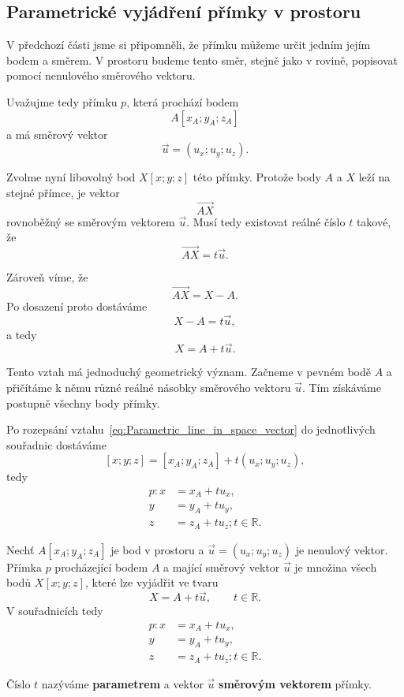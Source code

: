 \subsection{Parametrické vyjádření přímky v prostoru}
\label{subsec:Parametric_line_in_space}

V předchozí části jsme si připomněli, že přímku můžeme určit jedním jejím
bodem a směrem. V prostoru budeme tento směr, stejně jako v rovině,
popisovat pomocí nenulového směrového vektoru.

Uvažujme tedy přímku $p$, která prochází bodem
\[
    A[x_A;y_A;z_A]
\]
a má směrový vektor
\[
    \vec{u}=(u_x;u_y;u_z).
\]

Zvolme nyní libovolný bod $X[x;y;z]$ této přímky. Protože body $A$ a $X$
leží na stejné přímce, je vektor
\[
    \overrightarrow{AX}
\]
rovnoběžný se směrovým vektorem $\vec{u}$. Musí tedy existovat reálné číslo
$t$ takové, že
\[
    \overrightarrow{AX}=t\vec{u}.
\]

Zároveň víme, že
\[
    \overrightarrow{AX}=X-A.
\]
Po dosazení proto dostáváme
\[
    X-A=t\vec{u},
\]
a tedy
\begin{equation}
    X=A+t\vec{u}.
    \label{eq:Parametric_line_in_space_vector}
\end{equation}

Tento vztah má jednoduchý geometrický význam. Začneme v pevném bodě $A$
a přičítáme k němu různé reálné násobky směrového vektoru $\vec{u}$.
Tím získáváme postupně všechny body přímky.

Po rozepsání vztahu~\eqref{eq:Parametric_line_in_space_vector} do
jednotlivých souřadnic dostáváme
\[
    [x;y;z]
    =
    [x_A;y_A;z_A]
    +
    t(u_x;u_y;u_z),
\]
tedy
\[
\begin{aligned}
    p: x&=x_A+t u_x,\\
    y&=y_A+t u_y,\\
    z&=z_A+t u_z; t\in\mathbb{R}.
\end{aligned}
\]

\begin{definition}
    \label{def:Parametric_line_in_space}
    Nechť $A[x_A;y_A;z_A]$ je bod v prostoru a
    $\vec{u}=(u_x;u_y;u_z)$ je nenulový vektor.
    Přímka $p$ procházející bodem $A$ a mající směrový vektor $\vec{u}$
    je množina všech bodů $X[x;y;z]$, které lze vyjádřit ve tvaru
    \[
        X=A+t\vec{u},\qquad t\in\mathbb{R}.
    \]
    V souřadnicích tedy
    \begin{equation}
        \begin{aligned}
            p: x&=x_A+t u_x,\\
            y&=y_A+t u_y,\\
            z&=z_A+t u_z; t\in\mathbb{R}.
        \end{aligned}
        \label{eq:Parametric_line_in_space_coordinates}
    \end{equation}

    Číslo $t$ nazýváme \textbf{parametrem} a vektor $\vec{u}$
    \textbf{směrovým vektorem} přímky.
\end{definition}

